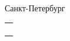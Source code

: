 \documentclass[12pt]{article}
\begin{document}
		\vspace{\baselineskip}
		\vspace{\baselineskip}
		\vspace{\baselineskip}
		\vspace{\baselineskip}
		\vspace{\baselineskip}
		\begin{Center}
			Санкт-Петербург \the\year{}
		\end{Center}\par
		\newpage
		\begin{table}[H]
    \centering
    \begin{tabular}{p{6.49in}}
        \hhline{~}
        \multicolumn{1}{p{6.49in}}{
        } \\
        \hhline{~}
        \multicolumn{1}{p{6.49in}}{} \\
        \hhline{~}
        \multicolumn{1}{p{6.49in}}{} \\
        \hhline{~}
    \end{tabular}
\end{table}

	
\end{document}

